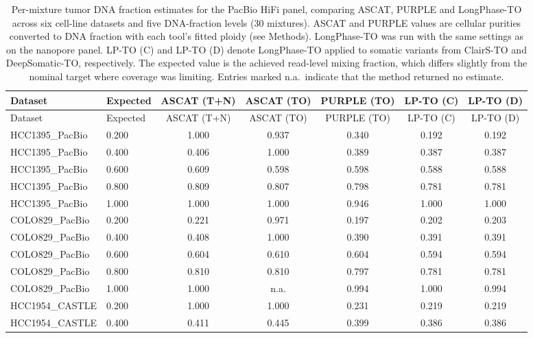 \documentclass[pdflatex,sn-nature]{sn-jnl}
\begin{document}
\begin{small}
\begin{longtable}{@{}llccccc@{}}
  \caption[Tumor DNA fraction estimates for the PacBio HiFi panel]%
  {Per-mixture tumor DNA fraction estimates for the PacBio HiFi panel, comparing ASCAT, PURPLE and
  LongPhase-TO across six cell-line datasets and five DNA-fraction levels (30 mixtures). ASCAT and
  PURPLE values are cellular purities converted to DNA fraction with each tool's fitted ploidy (see Methods). LongPhase-TO was run with the same settings as on the nanopore panel. LP-TO (C) and LP-TO (D) denote LongPhase-TO applied to somatic variants from ClairS-TO and DeepSomatic-TO, respectively. The expected value is the achieved read-level mixing fraction, which differs slightly from the nominal target where coverage was limiting. Entries marked n.a.\ indicate that the method returned no estimate.}
  \label{tab:pacbio-tumor-purity}\\
  \toprule
  Dataset & Expected & ASCAT (T+N) & ASCAT (TO) & PURPLE (TO) & LP-TO (C) & LP-TO (D) \\
  \midrule
  \endfirsthead
  \toprule
  Dataset & Expected & ASCAT (T+N) & ASCAT (TO) & PURPLE (TO) & LP-TO (C) & LP-TO (D) \\
  \midrule
  \endhead
  \bottomrule
  \endlastfoot
  HCC1395\_PacBio & 0.200 & 1.000 & 0.937 & 0.340 & 0.192 & 0.192 \\
  HCC1395\_PacBio & 0.400 & 0.406 & 1.000 & 0.389 & 0.387 & 0.387 \\
  HCC1395\_PacBio & 0.600 & 0.609 & 0.598 & 0.598 & 0.588 & 0.588 \\
  HCC1395\_PacBio & 0.800 & 0.809 & 0.807 & 0.798 & 0.781 & 0.781 \\
  HCC1395\_PacBio & 1.000 & 1.000 & 1.000 & 0.946 & 1.000 & 1.000 \\
  \addlinespace
  COLO829\_PacBio & 0.200 & 0.221 & 0.971 & 0.197 & 0.202 & 0.203 \\
  COLO829\_PacBio & 0.400 & 0.408 & 1.000 & 0.390 & 0.391 & 0.391 \\
  COLO829\_PacBio & 0.600 & 0.604 & 0.610 & 0.604 & 0.594 & 0.594 \\
  COLO829\_PacBio & 0.800 & 0.810 & 0.810 & 0.797 & 0.781 & 0.781 \\
  COLO829\_PacBio & 1.000 & 1.000 & n.a. & 0.994 & 1.000 & 0.994 \\
  \addlinespace
  HCC1954\_CASTLE & 0.200 & 1.000 & 1.000 & 0.231 & 0.219 & 0.219 \\
  HCC1954\_CASTLE & 0.400 & 0.411 & 0.445 & 0.399 & 0.386 & 0.386 \\

\end{longtable}
\end{small}
\end{document}
